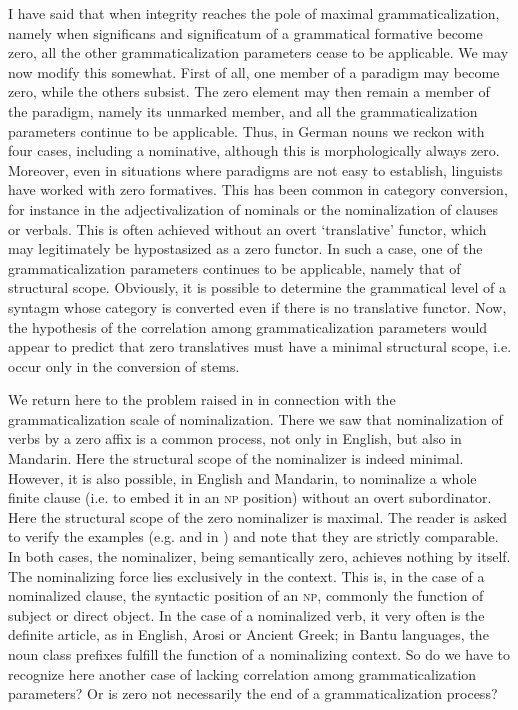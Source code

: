 I have said that when integrity reaches the pole of maximal grammaticalization, namely when significans and significatum of a grammatical formative become zero, all the other grammaticalization parameters cease to be applicable. We may now modify this somewhat. First of all, one member of a paradigm may become zero, while the others subsist. The zero element may then remain a member of the paradigm, namely its unmarked member, and all the grammaticalization parameters continue to be applicable. Thus, in German nouns we reckon with four cases, including a nominative, although this is morphologically always zero. Moreover, even in situations where paradigms are not easy to establish, linguists have worked with zero formatives. This has been common in category conversion, for instance in the adjectivalization of nominals or the nominalization of clauses or verbals. This is often achieved without an overt ‘translative’ functor, which may legitimately be hypostasized as a zero functor. In such a case, one of the grammaticalization parameters continues to be applicable, namely that of structural scope. Obviously, it is possible to determine the grammatical level of a syntagm whose category is converted even if there is no translative functor. Now, the hypothesis of the correlation among grammaticalization parameters would appear to predict that zero translatives must have a minimal structural scope, i.e. occur only in the conversion of stems.

We return here to the problem raised in  in connection with the grammaticalization scale of nominalization. There we saw that nominalization of verbs by a zero affix is a common process, not only in English, but also in Mandarin. Here the structural scope of the nominalizer is indeed minimal. However, it is also possible, in English and Mandarin, to nominalize a whole finite clause (i.e. to embed it in an \textsc{np} position) without an overt subordinator. Here the structural scope of the zero nominalizer is maximal. The reader is asked to verify the examples (e.g.  and  in ) and note that they are strictly comparable. In both cases, the nominalizer, being semantically zero, achieves nothing by itself. The nominalizing force lies exclusively in the context. This is, in the case of a nominalized clause, the syntactic position of an \textsc{np}, commonly the function of subject or direct object. In the case of a nominalized verb, it very often is the definite article, as in English, Arosi or Ancient Greek; in Bantu languages, the noun class prefixes fulfill the function of a nominalizing context. So do we have to recognize here another case of lacking correlation among grammaticalization parameters? Or is zero not necessarily the end of a grammaticalization process?

